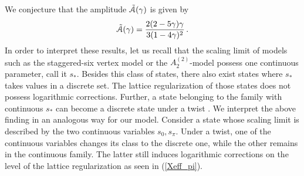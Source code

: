 \documentclass[12pt]{article}
\numberwithin{equation}{section}
\begin{document}
We conjecture that the amplitude $\Tilde{\mathcal{A}}(\gamma)$ is given by 
\begin{align}
    \Tilde{\mathcal{A}}(\gamma)=\frac{2 (2-5 \gamma ) \gamma }{3 (1-4 \gamma )^2}\,.
\end{align}
In order to interpret these results, let us recall that the scaling limit of models such as the staggered-six vertex model or the $A^{(2)}_2$-model possess one continuous parameter, call it $s_*$. Besides this class of states, there also exist states where $s_*$ takes values in a discrete set. The lattice regularization of those states does not possess logarithmic corrections. Further, a state belonging to the family with continuous $s_*$ can become a discrete state under a twist \cite{BKKL21a,VeJS14}. We interpret the above finding in an analogous way for our model. Consider a state whose scaling limit is described by the two continuous variables $s_0,s_\pi$. Under a twist, one of the continuous variables changes its class to the discrete one, while the other remains in the continuous family. The latter still induces logarithmic corrections on the level of the lattice regularization as seen in (\ref{Xeff_pi}). \\
\end{document}
